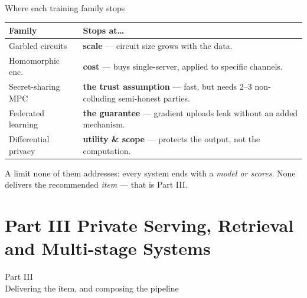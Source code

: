 \documentclass[10pt,aspectratio=169]{beamer}
\newcommand{\tbf}[1]{\textbf{#1}}
\begin{document}
\begin{frame}{Where each training family stops}
  \centering\small
  \renewcommand{\arraystretch}{1.4}
  \begin{tabular}{@{}p{3.4cm}p{7.5cm}@{}}
    \toprule
    \tbf{Family} & \tbf{Stops at\ldots}\\
    \midrule
    Garbled circuits    & \textbf{scale} --- circuit size grows with the data.\\
    Homomorphic enc.\   & \textbf{cost} --- buys single-server, applied to specific channels.\\
    Secret-sharing MPC  & \textbf{the trust assumption} --- fast, but needs 2--3 non-colluding semi-honest parties.\\
    Federated learning  & \textbf{the guarantee} --- gradient uploads leak without an added mechanism.\\
    Differential privacy& \textbf{utility \& scope} --- protects the output, not the computation.\\
    \bottomrule
  \end{tabular}
 
  \vspace{0.8em}
  \begin{center}
  \alert{A limit none of them addresses:} every system ends with a \emph{model or scores}.
  None delivers the recommended \emph{item} --- that is Part III.
  \end{center}
\end{frame}
 
\section{Part III \textbar{} Private Serving, Retrieval and Multi-stage Systems}
 
\begin{frame}[standout]
  Part III\\[0.4em]
  {\normalsize Delivering the item, and composing the pipeline}
\end{frame}
 
\end{document}
